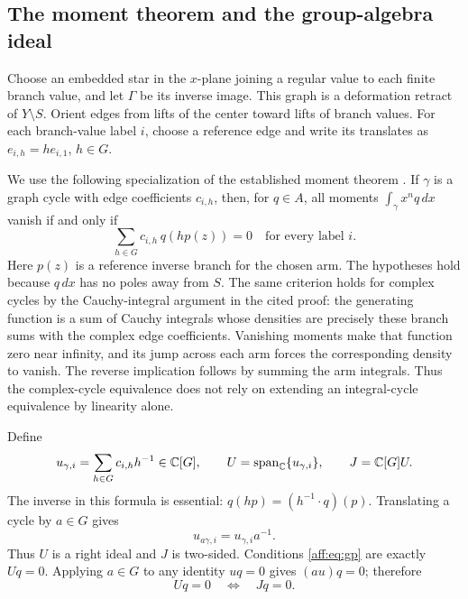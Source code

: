 \subsection{The moment theorem and the group-algebra ideal}

Choose an embedded star in the $x$-plane joining a regular value to each finite
branch value, and let $\Gamma$ be its inverse image. This graph is a deformation
retract of $Y\setminus S$. Orient edges from lifts of the center toward lifts
of branch values. For each branch-value label $i$, choose a reference edge and
write its translates as $e_{i,h}=h e_{i,1}$, $h\in G$.

We use the following specialization of the established moment theorem
\cite[Theorem~2.1 and the subsequent edge-count formula]{GP2014}.
If $\gamma$ is a graph cycle with edge coefficients $c_{i,h}$, then, for $q\in A$,
all moments $\int_\gamma x^nq\,dx$ vanish if and only if
\begin{equation}\label{aff:eq:gp}
 \sum_{h\in G}c_{i,h}\,q(hp(z))=0
 \quad\text{for every label }i.
\end{equation}
Here $p(z)$ is a reference inverse branch for the chosen arm. The hypotheses
hold because $q\,dx$ has no poles away from $S$. The same criterion holds for
complex cycles by the Cauchy-integral argument in the cited proof: the
generating function is a sum of Cauchy integrals whose densities are precisely
these branch sums with the complex edge coefficients. Vanishing moments make
that function zero near infinity, and its jump across each arm forces the
corresponding density to vanish. The reverse implication follows by summing
the arm integrals. Thus the complex-cycle equivalence does not rely on
extending an integral-cycle equivalence by linearity alone.

Define
\[
 u_{\gamma,i}=\sum_{h\in G}c_{i,h}h^{-1}\in\mathbb C[G],\qquad
 U=\operatorname{span}_{\mathbb C}\{u_{\gamma,i}\},\qquad J=\mathbb C[G]U.
\]
The inverse in this formula is essential: $q(hp)=(h^{-1}\cdot q)(p)$.
Translating a cycle by $a\in G$ gives
\begin{equation}\label{aff:eq:right-ideal}
 u_{a\gamma,i}=u_{\gamma,i}a^{-1}.
\end{equation}
Thus $U$ is a right ideal and $J$ is two-sided. Conditions \eqref{aff:eq:gp} are
exactly $Uq=0$. Applying $a\in G$ to any identity $uq=0$ gives $(au)q=0$;
therefore
\begin{equation}\label{aff:eq:ideal-condition}
 Uq=0\quad\Longleftrightarrow\quad Jq=0.
\end{equation}

